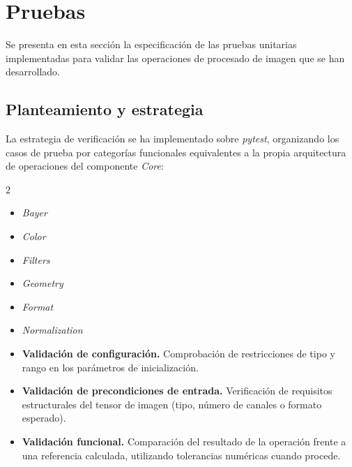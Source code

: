 \section{Pruebas} \label{sec:8_pruebas}
Se presenta en esta sección la especificación de las pruebas unitarias implementadas para validar
las operaciones de procesado de imagen que se han desarrollado.

\subsection{Planteamiento y estrategia} \label{subsec:8_1_planteamiento_y_estrategia}
La estrategia de verificación se ha implementado sobre \textit{pytest}, organizando los casos de prueba
por categorías funcionales equivalentes a la propia arquitectura de operaciones del componente
\textit{Core}:

\begin{multicols}{2}
	\begin{itemize}[noitemsep]
		\item \textit{Bayer}
		\item \textit{Color}
		\item \textit{Filters}
		\item \textit{Geometry}
		\item \textit{Format}
		\item \textit{Normalization}
	\end{itemize}
\end{multicols}


\begin{itemize}[noitemsep]
	\item \textbf{Validación de configuración.} Comprobación de restricciones de tipo y rango en
	      los parámetros de inicialización.
	\item \textbf{Validación de precondiciones de entrada.} Verificación de requisitos estructurales
	      del tensor de imagen (tipo, número de canales o formato esperado).
	\item \textbf{Validación funcional.} Comparación del resultado de la operación frente a una
	      referencia calculada, utilizando tolerancias numéricas cuando procede.
\end{itemize}


